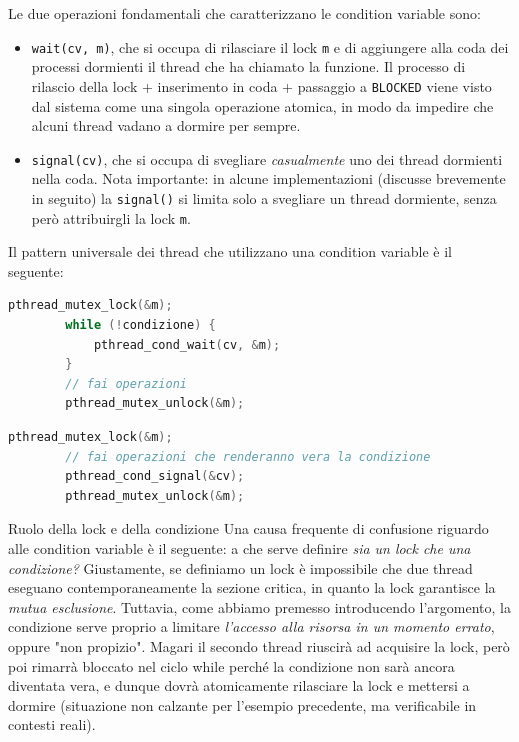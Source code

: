 \documentclass[12pt]{report}
\begin{document}
	Le due operazioni fondamentali che caratterizzano le condition variable sono:
	\begin{itemize}
		\item \texttt{wait(cv, m)}, che si occupa di rilasciare il lock \texttt{m} e di aggiungere alla coda dei processi dormienti il thread che ha chiamato la funzione. Il processo di rilascio della lock + inserimento in coda + passaggio a \texttt{BLOCKED} viene visto dal sistema come una singola operazione atomica, in modo da impedire che alcuni thread vadano a dormire per sempre.
		
		\item \texttt{signal(cv)}, che si occupa di svegliare \textit{casualmente} uno dei thread dormienti nella coda. Nota importante: in alcune implementazioni (discusse brevemente in seguito) la \texttt{signal()} si limita solo a svegliare un thread dormiente, senza però attribuirgli la lock \texttt{m}.
	\end{itemize}
	
	Il pattern universale dei thread che utilizzano una condition variable è il seguente:
	\begin{lstlisting}[language=C, caption={Pattern per il thread attendente}]
		pthread_mutex_lock(&m);
		while (!condizione) {
			pthread_cond_wait(cv, &m);
		}
		// fai operazioni
		pthread_mutex_unlock(&m);
	\end{lstlisting}
	
	\begin{lstlisting}[language=C, caption={Pattern per il thread eseguente}]
		pthread_mutex_lock(&m);
		// fai operazioni che renderanno vera la condizione
		pthread_cond_signal(&cv);
		pthread_mutex_unlock(&m);
	\end{lstlisting}
	
	\begin{osservazione}{Ruolo della lock e della condizione}{}
		Una causa frequente di confusione riguardo alle condition variable è il seguente: a che serve definire \textit{sia un lock che una condizione?} Giustamente, se definiamo un lock è impossibile che due thread eseguano contemporaneamente la sezione critica, in quanto la lock garantisce la \textit{mutua esclusione}. Tuttavia, come abbiamo premesso introducendo l'argomento, la condizione serve proprio a limitare \textit{l'accesso alla risorsa in un momento errato}, oppure "non propizio". Magari il secondo thread riuscirà ad acquisire la lock, però poi rimarrà bloccato nel ciclo while perché la condizione non sarà ancora diventata vera, e dunque dovrà atomicamente rilasciare la lock e mettersi a dormire (situazione non calzante per l'esempio precedente, ma verificabile in contesti reali).
	\end{osservazione}
	
\end{document}
